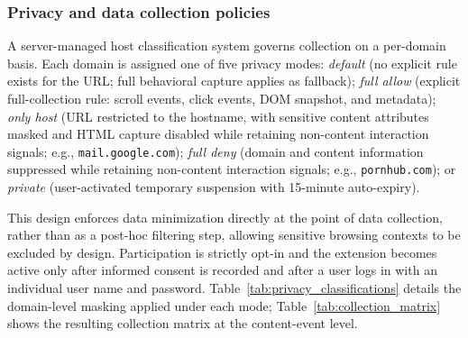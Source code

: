 \documentclass[preprint,12pt,a4paper]{elsarticle}
\begin{document}
\subsubsection{Privacy and data collection policies}\label{sec:privacy}

A server-managed host classification system governs collection on a per-domain basis. Each domain is assigned one of five privacy modes: \emph{default} (no explicit rule exists for the URL; full behavioral capture applies as fallback); \emph{full allow} (explicit full-collection rule: scroll events, click events, DOM snapshot, and metadata); \emph{only host} (URL restricted to the hostname, with sensitive content attributes masked and HTML capture disabled while retaining non-content interaction signals; e.g., \texttt{mail.google.com}); \emph{full deny} (domain and content information suppressed while retaining non-content interaction signals; e.g., \texttt{pornhub.com}); or \emph{private} (user-activated temporary suspension with 15-minute auto-expiry).

This design enforces data minimization directly at the point of data collection, rather than as a post-hoc filtering step, allowing sensitive browsing contexts to be excluded by design. Participation is strictly opt-in and the extension becomes active only after informed consent is recorded and after a user logs in with an individual user name and password. Table~\ref{tab:privacy_classifications} details the domain-level masking applied under each mode; Table~\ref{tab:collection_matrix} shows the resulting collection matrix at the content-event level.

  \begin{table}[htbp]
    \centering
    \small
    \caption{Privacy policy classifications and domain-level attribute masking.}
    \label{tab:privacy_classifications}

\end{table}
\end{document}
